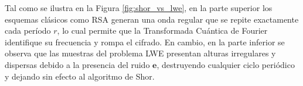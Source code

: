 Tal como se ilustra en la Figura \ref{fig:shor_vs_lwe}, en la parte superior los esquemas clásicos como RSA generan una onda regular que se repite exactamente cada período $r$, lo cual permite que la Transformada Cuántica de Fourier identifique su frecuencia y rompa el cifrado. En cambio, en la parte inferior se observa que las muestras del problema LWE presentan alturas irregulares y dispersas debido a la presencia del ruido $\mathbf{e}$, destruyendo cualquier ciclo periódico y dejando sin efecto al algoritmo de Shor.

